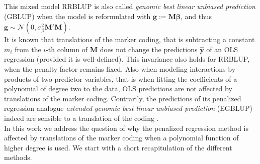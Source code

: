 \documentclass{bmcart}
\newcommand{\M}{\mathbf{M}}
\newcommand{\0}{\mathbf{0}}
\newcommand{\y}{\mathbf{y}}
\begin{document}
This mixed model RRBLUP is also called \emph{genomic best linear unbiased prediction} (GBLUP) when the model is reformulated with $\mathbf{g}:=\M \bm{\beta}$, and thus $\mathbf{g}\sim \mathcal{N}(0,\sigma_\beta^2 \M' \M)$. \\

It is known that translations of the marker coding, that is subtracting a constant $m_i$ from the $i$-th column of $\M$ does not change the predictions $\hat{\y}$ of an  OLS regression (provided it is well-defined). This invariance also holds for RRBLUP, when the penalty factor remains fixed. Also when modeling interactions by products of two predictor variables, that is when fitting the coefficients of a polynomial of degree two to the data, OLS predictions are not affected by translations of the marker coding. Contrarily, the predictions of its penalized regression analogue \emph{extended genomic best linear unbiased prediction} (EGBLUP) indeed are sensible to a translation of the coding \cite{he2016does,Martini17}.\\

In this work we address the question of why the penalized regression method is affected by translations of the marker coding when a polynomial function of higher degree is used. 
We  start with a short recapitulation of the different methods.
\end{document}
